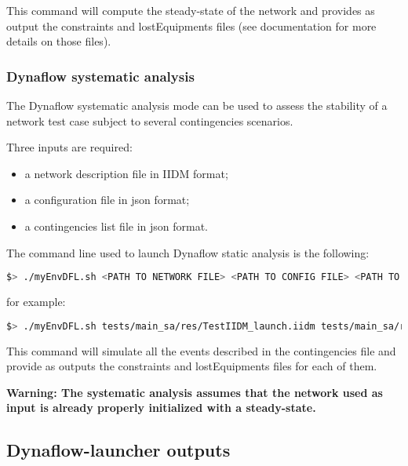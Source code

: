 \documentclass[a4paper, 12pt]{report}
\begin{document}
This command will compute the steady-state of the network and provides as
output the constraints and lostEquipments files (see \Dynawo documentation for more details on those files).

\subsubsection{Dynaflow systematic analysis}

The Dynaflow systematic analysis mode can be used to assess the stability of a network test case subject to several contingencies scenarios.

Three inputs are required:
\begin{itemize}
  \item a network description file in IIDM format;
  \item a configuration file in json format;
  \item a contingencies list file in json format.
\end{itemize}

The command line used to launch Dynaflow static analysis is the following:

\begin{lstlisting}[language=bash, breaklines=true, breakatwhitespace=false, columns=fullflexible]
$> ./myEnvDFL.sh <PATH TO NETWORK FILE> <PATH TO CONFIG FILE> <PATH TO CONTINGENCIES FILE>
\end{lstlisting}

for example:

\begin{lstlisting}[language=bash, breaklines=true, breakatwhitespace=false, columns=fullflexible]
$> ./myEnvDFL.sh tests/main_sa/res/TestIIDM_launch.iidm tests/main_sa/res/config_launch.json tests/main_sa/res/contingencies_launch.json
\end{lstlisting}

This command will simulate all the events described in the contingencies file and provide as outputs the constraints and lostEquipments files for each of them.

\textbf{Warning: The systematic analysis assumes that the network used as input is already properly initialized with a steady-state.}

\subsection[Dynaflow-launcher outputs]{Dynaflow-launcher outputs}
\end{document}
